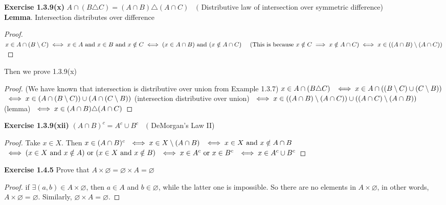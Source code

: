 \documentclass[12pt]{article}
\theoremstyle{definition}
\numberwithin{equation}{subsection}
\begin{document}
\textbf{Exercise 1.3.9(x)} \(A \cap(B \triangle C)=(A \cap B) \triangle(A \cap C) \quad(\) Distributive law of intersection over symmetric difference)
\\\textbf{Lemma}. Intersection distributes over difference
\begin{proof}
\(x \in A \cap (B \setminus C)
\\\iff x \in A \text{ and } x \in B \text{ and } x \notin C
\\\iff (x \in A \cap B) \text{ and } (x \notin A \cap C) \text{ \quad(This is because $x \notin C \implies x \notin A \cap C$)}
\\\iff x \in ((A \cap B) \setminus (A \cap C))
\)
\end{proof}
Then we prove 1.3.9(x)\\
\begin{proof}
(We have known that intersection is distributive over union from Example 1.3.7)
$\\ x \in A \cap(B \triangle C)$
$\\\iff x \in A \cap ((B \setminus C) \cup(C \setminus B)) $
$\\\iff x \in (A \cap (B \setminus C)) \cup (A \cap (C \setminus B))$ \quad(intersection distributive over union)
\newcommand{\m}{(A \cap B)}
\newcommand{\n}{(A \cap C)}
$\\\iff x \in (\m \setminus \n) \cup (\n \setminus \m)$ \quad (lemma)
$\\\iff x \in \m \triangle \n$
\let\m\undefined
\let\n\undefined
\end{proof}

\textbf{Exercise 1.3.9(xii)} \((A \cap B)^{c} = A^{c} \cup B^{c} \quad(\) DeMorgan's Law II)
\begin{proof}
Take $x \in X$. Then $\\ x \in (A \cap B)^{c}$
$\\\iff x \in X \setminus (A \cap B)$
$\\\iff x \in X \text{ and } x \notin A \cap B$
$\\\iff (x \in X \text{ and } x \notin A) \text{ or } (x \in X \text{ and } x \notin B)$
$\\\iff x \in A^{c} \text{ or } x \in B^{c}$
$\\\iff x \in A^{c} \cup B^{c}$
\end{proof}

\textbf{Exercise 1.4.5} Prove that \(A \times \varnothing=\varnothing \times A=\varnothing\)
\begin{proof}
if $\exists (a, b) \in A \times \varnothing$, then \(a \in A\) and \(b \in \varnothing\), while the latter one is impossible. So there are no elements in $A \times \varnothing$, in other words, \(A \times \varnothing=\varnothing\). Similarly, \(\varnothing \times A=\varnothing\).
\end{proof}
\end{document}
